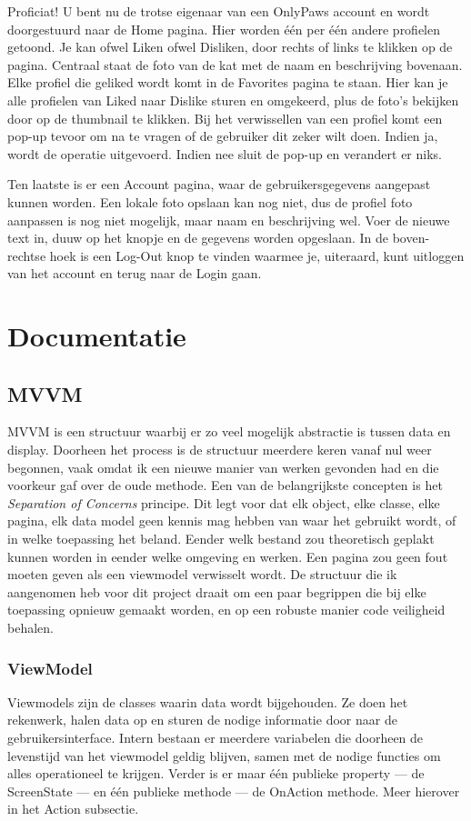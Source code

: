 \documentclass{report}
\begin{document}
Proficiat! U bent nu de trotse eigenaar van een OnlyPaws account en wordt doorgestuurd naar de Home pagina.
Hier worden één per één andere profielen getoond. Je kan ofwel Liken ofwel Disliken, door rechts of links te klikken op de pagina. 
Centraal staat de foto van de kat met de naam en beschrijving bovenaan.
Elke profiel die geliked wordt komt in de Favorites pagina te staan. Hier kan je alle profielen van Liked naar Dislike sturen en omgekeerd, plus de foto's bekijken door op de thumbnail te klikken.
Bij het verwissellen van een profiel komt een pop-up tevoor om na te vragen of de gebruiker dit zeker wilt doen. Indien ja, wordt de operatie uitgevoerd. Indien nee sluit de pop-up en verandert er niks.

Ten laatste is er een Account pagina, waar de gebruikersgegevens aangepast kunnen worden. Een lokale foto opslaan kan nog niet, dus de profiel foto aanpassen is nog niet mogelijk, maar naam en beschrijving wel.
Voer de nieuwe text in, duuw op het knopje en de gegevens worden opgeslaan.
In de boven-rechtse hoek is een Log-Out knop te vinden waarmee je, uiteraard, kunt uitloggen van het account en terug naar de Login gaan.


\chapter{Documentatie}
\section{MVVM}
MVVM is een structuur waarbij er zo veel mogelijk abstractie is tussen data en display. Doorheen het process is de structuur meerdere keren vanaf nul weer begonnen,
vaak omdat ik een nieuwe manier van werken gevonden had en die voorkeur gaf over de oude methode.
Een van de belangrijkste concepten is het \textit{Separation of Concerns} principe. Dit legt voor dat elk object, elke classe, elke pagina, elk data model geen kennis mag hebben van waar het gebruikt wordt, of in welke toepassing het beland.
Eender welk bestand zou theoretisch geplakt kunnen worden in eender welke omgeving en werken. Een pagina zou geen fout moeten geven als een viewmodel verwisselt wordt.
De structuur die ik aangenomen heb voor dit project draait om een paar begrippen die bij elke toepassing opnieuw gemaakt worden,
en op een robuste manier code veiligheid behalen.


\subsection{ViewModel}
Viewmodels zijn de classes waarin data wordt bijgehouden. Ze doen het rekenwerk, halen data op en sturen de nodige informatie door naar de gebruikersinterface.
Intern bestaan er meerdere variabelen die doorheen de levenstijd van het viewmodel geldig blijven, samen met de nodige functies om alles operationeel te krijgen.
Verder is er maar één publieke property --- de ScreenState --- en één publieke methode --- de OnAction methode. Meer hierover in het Action subsectie.
\end{document}
